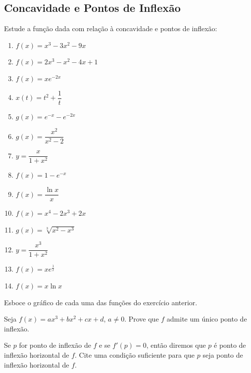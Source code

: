 \clearpage

\subsection{Concavidade e Pontos de Inflexão}

\begin{exercicio}[1]
Estude a função dada com relação à concavidade e pontos de inflexão:
\begin{enumerate}[label=\alph*)]
    \item $f(x) = x^3 - 3x^2 - 9x$
    \item $f(x) = 2x^3 - x^2 - 4x + 1$
    \item $f(x) = xe^{-2x}$
    \item $x(t) = t^2 + \dfrac{1}{t}$
    \item $g(x) = e^{-x} - e^{-2x}$
    \item $g(x) = \dfrac{x^2}{x^2 - 2}$
    \item $y = \dfrac{x}{1 + x^2}$
    \item $f(x) = 1 - e^{-x}$
    \item $f(x) = \dfrac{\ln x}{x}$
    \item $f(x) = x^4 - 2x^3 + 2x$
    \item $g(x) = \sqrt[3]{x^2 - x^3}$
    \item $y = \dfrac{x^3}{1 + x^2}$
    \item $f(x) = xe^{\frac{1}{x}}$
    \item $f(x) = x \ln x$
\end{enumerate}
\end{exercicio}

\begin{exercicio}[2]
Esboce o gráfico de cada uma das funções do exercício anterior.
\end{exercicio}

\begin{exercicio}[3]
Seja $f(x) = ax^3 + bx^2 + cx + d$, $a \neq 0$. Prove que $f$ admite um único ponto de inflexão.
\end{exercicio}

\begin{exercicio}[4]
Se $p$ for ponto de inflexão de $f$ e se $f'(p) = 0$, então diremos que $p$ é ponto de inflexão horizontal de $f$. Cite uma condição suficiente para que $p$ seja ponto de inflexão horizontal de $f$.
\end{exercicio}

